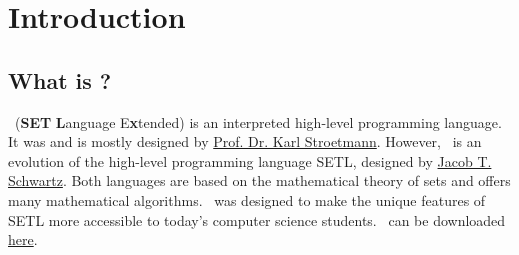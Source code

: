 
\chapter{Introduction}

\section{What is \setlx?}

	\setlx\ (\textbf{SET} \textbf{L}anguage E\textbf{x}tended) is an interpreted high-level programming language. It was and is mostly designed by \href{https://github.com/karlstroetmann}{Prof. Dr. Karl Stroetmann}. However, \setlx\ is an evolution of the high-level programming language SETL, designed by \href{https://en.wikipedia.org/wiki/Jacob_T._Schwartz}{Jacob T. Schwartz}. Both languages are based on the mathematical theory of sets and offers many mathematical algorithms. \setlx\ was designed to make the unique features of SETL more accessible to today's computer science students. \setlx\ can be downloaded \href{https://randoom.org/Software/SetlX}{here}.